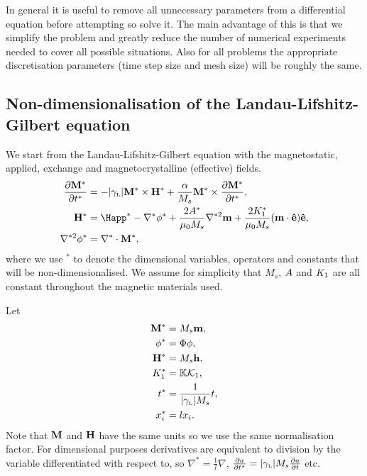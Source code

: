 In general it is useful to remove all unnecessary parameters from a differential equation before attempting so solve it.
The main advantage of this is that we simplify the problem and greatly reduce the number of numerical experiments needed to cover all possible situations.
Also for all problems the appropriate discretisation parameters (time step size and mesh size) will be roughly the same. 

\subsection{Non-dimensionalisation of the Landau-Lifshitz-Gilbert equation}
\label{sec:land-lifsh-gilb-normalisation}

We start from the Landau-Lifshitz-Gilbert equation with the magnetostatic, applied, exchange and magnetocrystalline (effective) fields. 
\begin{align}
  \pd{\Mv^*}{t^*} &= - \gymagc \Mv^* \times \Hv^* + \frac{\alpha}{M_s} \Mv^* \times \pd{\Mv^*}{t^*}, 
                    \label{eqn:llgnd} \\
  \Hv^* &= \Happ^* - \nabla^* \phi^* + \frac{2\Exchc^*}{\mu_0 M_s} \nabla^{*2} \mv + \frac{2\Kone^*}{\mu_0 M_s} (\mv \cdot \ev) \ev,
          \label{eqn:effnd} \\
  \nabla^{*2} \phi^* &= \nabla^* \cdot \Mv^*, 
                       \label{eqn:phind}
\end{align}
where we use $^*$ to denote the dimensional variables, operators and constants that will be non-dimensionalised. We assume for simplicity that $M_s$, $A$ and $K_1$ are all
constant throughout the magnetic materials used.

Let
\begin{equation}
  \label{eqn:nddefs}
  \begin{aligned}
    \mathbf{M}^* &= M_s \mathbf{m},  \\
    \phi^* &= \Phi \phi,  \\
    \mathbf{H}^* &= M_s \mathbf{h},  \\
    K_1^* &= \mathbb{K} \mathcal{K}_1,  \\
    t^* &= \frac{1}{{\left|{\gamma_{\text{\tiny{L}}}} \right|} M_s} t,  \\
    x_i^* &= l x_i. 
  \end{aligned}
\end{equation}
Note that $\mathbf{M}$ and $\mathbf{H}$ have the same units so we use the same normalisation factor. For dimensional purposes derivatives are equivalent to division by the variable differentiated with respect to, so $\nabla^* = \frac{1}{l} \nabla$, $\frac{\partial a}{\partial t^*} = {\left|{\gamma_{\text{\tiny{L}}}} \right|} M_s \frac{\partial a}{\partial t}$ etc.

